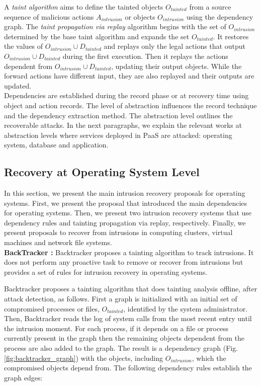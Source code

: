 A \textit{taint algorithm} aims to define the tainted objects $O_{tainted}$ from a source sequence of malicious actions $A_{intrusion}$ or objects $O_{intrusion}$ using the dependency graph. The \textit{taint propagation via replay} \cite{retro} algorithm begins with the set of $O_{intrusion}$ determined by the base taint algorithm and expands the set $O_{tainted}$. It restores the values of $O_{intrusion} \cup D_{tainted}$ and replays only the legal actions that output $O_{intrusion} \cup D_{tainted}$ during the first execution. Then it replays the actions dependent from $O_{intrusion} \cup D_{tainted}$, updating their output objects. While the forward actions have different input, they are also replayed and their outputs are updated.\\

Dependencies are established during the record phase or at recovery time using object and action records. The level of abstraction influences the record technique and the dependency extraction method. The abstraction level outlines the recoverable attacks. In the next paragraphs, we explain the relevant works at abstraction levels where services deployed in \ac{PaaS} are attacked: operating system, database and application.\\


\subsection{Recovery at Operating System Level}
\label{sec:related:recovery_os}

In this section, we present the main intrusion recovery proposals for operating systems. First, we present the proposal that introduced the main dependencies for operating systems. Then, we present two intrusion recovery systems that use dependency rules and tainting propagation via replay, respectively. Finally, we present proposals to recover from intrusions in computing clusters, virtual machines and network file systems.\\

\textbf{BackTracker \cite{backtracker}:} Backtracker proposes a tainting algorithm to track intrusions. It does not perform any proactive task to remove or recover from intrusions but provides a set of rules for intrusion recovery in operating systems.

Backtracker proposes a tainting algorithm that does tainting analysis offline, after attack detection, as follows. First a graph is initialized with an initial set of compromised processes or files, $O_{tainted}$, identified by the system administrator. Then, Backtracker reads the log of system calls from the most recent entry until the intrusion moment. For each process, if it depends on a file or process currently present in the graph then the remaining objects dependent from the process are also added to the graph. The result is a dependency graph (Fig. \ref{fig:backtracker_graph}) with the objects, including $O_{intrusion}$, which the compromised objects depend from. The following dependency rules establish the graph edges:

